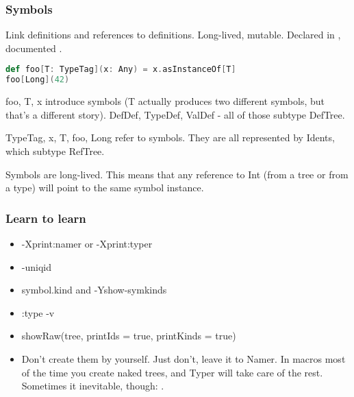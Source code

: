 \documentclass[hyperref={bookmarks=false}]{beamer}
\begin{document}
\begin{frame}[fragile]
\frametitle{Symbols}

Link definitions and references to definitions.
Long-lived, mutable.
Declared in , documented
.

\begin{lstlisting}[language=Scala]
def foo[T: TypeTag](x: Any) = x.asInstanceOf[T]
foo[Long](42)
\end{lstlisting}

foo, T, x introduce symbols (T actually produces two different symbols, but that's a different story).
DefDef, TypeDef, ValDef - all of those subtype DefTree.

TypeTag, x, T, foo, Long refer to symbols.
They are all represented by Idents, which subtype RefTree.

Symbols are long-lived. This means that any
reference to Int (from a tree or from a type) will point to the
same symbol instance.

\end{frame}

\begin{frame}[fragile]
\frametitle{Learn to learn}

\begin{itemize}
\item -Xprint:namer or -Xprint:typer
\item -uniqid
\item symbol.kind and -Yshow-symkinds
\item :type -v
\item showRaw(tree, printIds = true, printKinds = true)
\item Don't create them by yourself. Just don't, leave it to Namer. In macros most of the time you create naked trees, and Typer will take care of the rest. Sometimes it inevitable, though: .
\end{itemize}

\end{frame}
\end{document}
